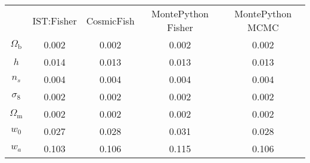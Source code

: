 \begin{table}
\centering
\begin{tabular}{|c|c|c|c|c|}
 & IST:Fisher & CosmicFish & MontePython Fisher & MontePython MCMC \\
$\Omega_\mathrm{b}$ & 0.002 & 0.002 & 0.002 & 0.002 \\
$h$ & 0.014 & 0.013 & 0.013 & 0.013 \\
$n_s$ & 0.004 & 0.004 & 0.004 & 0.004 \\
$\sigma_8$ & 0.002 & 0.002 & 0.002 & 0.002 \\
$\Omega_\mathrm{m}$ & 0.002 & 0.002 & 0.002 & 0.002 \\
$w_0$ & 0.027 & 0.028 & 0.031 & 0.028 \\
$w_a$ & 0.103 & 0.106 & 0.115 & 0.106 \\
\end{tabular}
\end{table}
